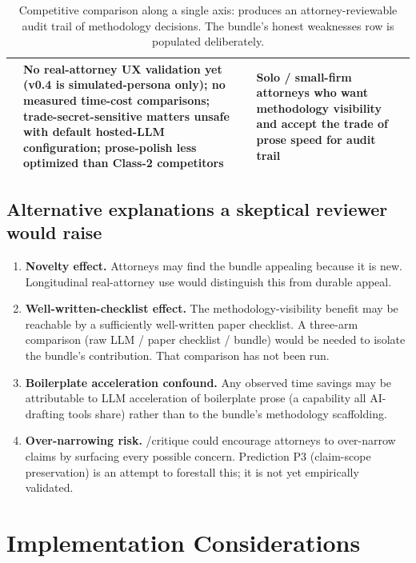 \documentclass[11pt,letterpaper]{article}
\begin{document}
\begin{table}[h]
\begin{tabularx}{\linewidth}{@{}p{2.1cm} X X p{2.4cm}@{}}
  & \textbf{No real-attorney UX validation yet} (v0.4 is simulated-persona only); no measured time-cost comparisons; trade-secret-sensitive matters unsafe with default hosted-LLM configuration; prose-polish less optimized than Class-2 competitors
  & Solo / small-firm attorneys who want methodology visibility and accept the trade of prose speed for audit trail \\
\bottomrule
\end{tabularx}
\caption{Competitive comparison along a single axis: produces an
attorney-reviewable audit trail of methodology decisions. The
bundle's honest weaknesses row is populated deliberately.}
\label{tab:competitive}
\end{table}

\subsection{Alternative explanations a skeptical reviewer would raise}

\begin{enumerate}[leftmargin=*,itemsep=0.2em]
\item \textbf{Novelty effect.} Attorneys may find the bundle appealing
  because it is new. Longitudinal real-attorney use would distinguish
  this from durable appeal.
\item \textbf{Well-written-checklist effect.} The methodology-visibility
  benefit may be reachable by a sufficiently well-written paper
  checklist. A three-arm comparison (raw LLM / paper checklist /
  bundle) would be needed to isolate the bundle's contribution. That
  comparison has not been run.
\item \textbf{Boilerplate acceleration confound.} Any observed time
  savings may be attributable to LLM acceleration of boilerplate
  prose (a capability all AI-drafting tools share) rather than to
  the bundle's methodology scaffolding.
\item \textbf{Over-narrowing risk.} /critique could encourage
  attorneys to over-narrow claims by surfacing every possible
  concern. Prediction P3 (claim-scope preservation) is an attempt to
  forestall this; it is not yet empirically validated.
\end{enumerate}

\section{Implementation Considerations}
\end{document}
